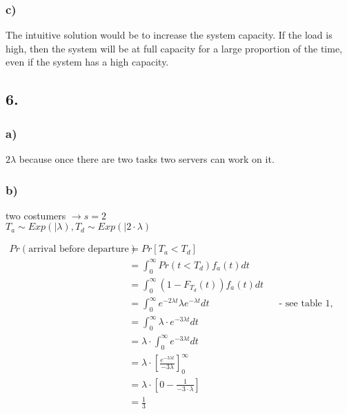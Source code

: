 \subsubsection*{ c) }
The intuitive solution would be to increase the system capacity.
If the load is high, then the system will be at full capacity for a large proportion of the time, even if the system has a high capacity.

\subsection*{ 6. }

\subsubsection*{ a) }


$2 \lambda$ because once there are two tasks two servers can work on it.

\subsubsection*{ b) }

two costumers $\rightarrow s=2$\\
$T_a \sim Exp(|\lambda), T_d \sim Exp( | 2 \cdot \lambda)$

\begin{align*}
Pr\left(\text{arrival before departure}\right)&=Pr\left[T_{a}< T_{d}\right]\\
&=\int _{0}^{\infty }Pr\left(t< T_{d}\right)f_{a}\left(t\right)dt\\
&=\int _{0}^{\infty }(1-F_{T_d}(t))f_{a}\left(t\right)dt\\
&=\int _{0}^{\infty }e^{{-2\lambda t}}\lambda e^{{-\lambda t}}dt&& \text{-  see table 1, A1.11 -}\\
&=\int _{0}^{\infty }\lambda \cdot e^{{-3\lambda t}}dt\\
&=\lambda \cdot \int _{0}^{\infty }e^{{-3\lambda t}}dt\\
&=\lambda \cdot \left[\frac{e^{{-3\lambda t}}}{-3\lambda }\right]_{0}^{\infty}\\
&=\lambda \cdot\left [0-\frac{1}{-3 \cdot \lambda}\right]\\
&=\frac{1}{3}
\end{align*}

